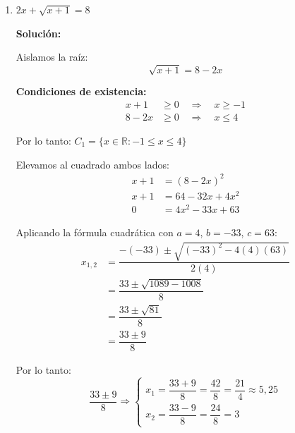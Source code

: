\documentclass[12pt]{article}
\newcommand{\solucion}{%
    \vspace{0.8em}%
    \textbf{Solución:}%
}
\begin{document}
\begin{enumerate}[label=\alph*.-]
    \textbf{Intersección con las condiciones de existencia:}

    Debemos verificar cuáles valores pertenecen a $C_1 = \{x \geq 3\}$:
    \begin{itemize}
        \item $x_1 = 4 + 2\sqrt{2} \approx 6{,}83 \geq 3$ \checkmark \ \ Pertenece a $C_1$
        \item $x_2 = 4 - 2\sqrt{2} \approx 1{,}17 < 3$ \quad $\Rightarrow$ No pertenece a $C_1$
    \end{itemize}

    \[
    \boxed{CS = \{4 + 2\sqrt{2}\}}
    \]

    \item $2x + \sqrt{x+1} = 8$

    \solucion

    Aislamos la raíz:
    \[
    \sqrt{x+1} = 8 - 2x
    \]

    \textbf{Condiciones de existencia:}
    \begin{align*}
    x + 1 &\geq 0 \quad \Rightarrow \quad x \geq -1 \\
    8 - 2x &\geq 0 \quad \Rightarrow \quad x \leq 4
    \end{align*}

    Por lo tanto: $C_1 = \{x \in \mathbb{R} : -1 \leq x \leq 4\}$

    Elevamos al cuadrado ambos lados:
    \begin{align*}
    x + 1 &= (8 - 2x)^2 \\[0.3em]
    x + 1 &= 64 - 32x + 4x^2 \\[0.3em]
    0 &= 4x^2 - 33x + 63
    \end{align*}

    Aplicando la fórmula cuadrática con $a = 4$, $b = -33$, $c = 63$:
    \begin{align*}
    x_{1,2} &= \dfrac{-(-33) \pm \sqrt{(-33)^2 - 4(4)(63)}}{2(4)} \\[0.3em]
    &= \dfrac{33 \pm \sqrt{1089 - 1008}}{8} \\[0.3em]
    &= \dfrac{33 \pm \sqrt{81}}{8} \\[0.3em]
    &= \dfrac{33 \pm 9}{8}
    \end{align*}

    Por lo tanto:
    \[
    \dfrac{33 \pm 9}{8} \Rightarrow \begin{cases} x_1 = \dfrac{33 + 9}{8} = \dfrac{42}{8} = \dfrac{21}{4} \approx 5{,}25 \\[0.6em] x_2 = \dfrac{33 - 9}{8} = \dfrac{24}{8} = 3 \end{cases}
    \]


\end{enumerate}
\end{document}
